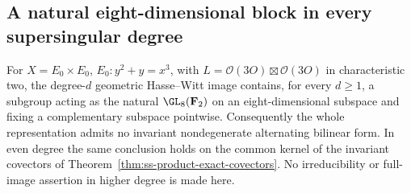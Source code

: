 \subsection{A natural eight-dimensional block in every supersingular degree}
\label{subsec:ss-uniform-GL8-block}

\begin{theorem}\label{thm:ss-uniform-GL8-block}
For $X=E_0\times E_0$, $E_0:y^2+y=x^3$, with
$L=\mathcal O(3O)\boxtimes\mathcal O(3O)$ in characteristic two,
the degree-$d$ geometric Hasse--Witt image contains, for every $d\ge1$,
a subgroup acting as the natural $\GL_8(\mathbf F_2)$ on an
eight-dimensional subspace and fixing a complementary subspace pointwise.
Consequently the whole representation admits no invariant nondegenerate
alternating bilinear form. In even degree the same conclusion holds on
the common kernel of the invariant covectors of
Theorem~\ref{thm:ss-product-exact-covectors}.
No irreducibility or full-image assertion in higher degree is made here.
\end{theorem}

